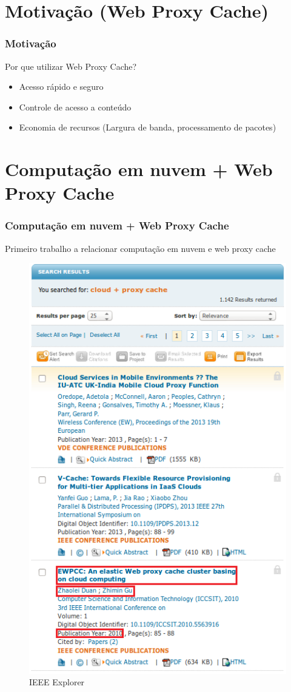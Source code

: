\documentclass{beamer}
\begin{document}
    \section{Motivação (Web Proxy Cache)}
    \begin{frame}
      \frametitle{Motivação}
      Por que utilizar Web Proxy Cache?
      \begin{itemize}
       \item <2-> Acesso rápido e seguro
       \item <3-> Controle de acesso a conteúdo
       \item <4-> Economia de recursos (Largura de banda, processamento de pacotes)
      \end{itemize}
    \end{frame}
    \section{Computação em nuvem + Web Proxy Cache}
    \begin{frame}
     \frametitle{Computação em nuvem + Web Proxy Cache}
     Primeiro trabalho a relacionar computação em nuvem e web proxy cache
     \begin{figure}
      \centering
      \includegraphics[scale=0.4]{imagens/pesquisa2.jpg}
      \caption{IEEE Explorer}
     \end{figure}

    \end{frame}
\end{document}
